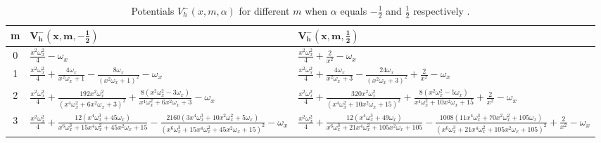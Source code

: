 \documentclass[12pt]{article}
\numberwithin{equation}{section} %
\begin{document}
\begin{table}[htp]
    \centering
    \renewcommand{\arraystretch}{1.5} %
    \setlength{\tabcolsep}{1.5em} %
    \begin{tabularx}{\columnwidth}{|c|X|X|}
    \toprule
    {\bf m} &$\mathbf{V_h^-(x,m,-\frac{1}{2})}$&$\mathbf{V_h^-(x,m,\frac{1}{2})}$\\
    \toprule
    0 &$\frac{x^2 \omega_x^2}{4} - \omega_x$ & $\frac{x^2 \omega_x^2}{4} + \frac{2}{x^2} - \omega_x$\\
    \bottomrule
    1 &$\frac{x^2 \omega_x^2}{4} + \frac{4 \omega_x}{x^2 \omega_x + 1} - \frac{8 \omega_x}{\left(x^2 \omega_x + 1\right)^2} - \omega_x$&$\frac{x^2 \omega_x^2}{4} + \frac{4 \omega_x}{x^2 \omega_x + 3} - \frac{24 \omega_x}{\left(x^2 \omega_x + 3\right)^2} + \frac{2}{x^2} - \omega_x$\\
    \bottomrule
    2 &$\frac{x^2 \omega_x^2}{4} + \frac{192 x^2 \omega_x^2}{\left(x^4 \omega_x^2 + 6 x^2 \omega_x + 3\right)^2} + \frac{8 \left(x^2 \omega_x^2 - 3 \omega_x\right)}{x^4 \omega_x^2 + 6 x^2 \omega_x + 3} - \omega_x$ &$\frac{x^2 \omega_x^2}{4} + \frac{320 x^2 \omega_x^2}{\left(x^4 \omega_x^2 + 10 x^2 \omega_x + 15\right)^2} + \frac{8 \left(x^2 \omega_x^2 - 5 \omega_x\right)}{x^4 \omega_x^2 + 10 x^2 \omega_x + 15} + \frac{2}{x^2} - \omega_x$\\
    \bottomrule
    3 &$\frac{x^2 \omega_x^2}{4} + \frac{12 \left(x^4 \omega_x^3 + 45 \omega_x\right)}{x^6 \omega_x^3 + 15 x^4 \omega_x^2 + 45 x^2 \omega_x + 15} - \frac{2160 \left(3 x^4 \omega_x^3 + 10 x^2 \omega_x^2 + 5 \omega_x\right)}{\left(x^6 \omega_x^3 + 15 x^4 \omega_x^2 + 45 x^2 \omega_x + 15\right)^2} - \omega_x$&$\frac{x^2 \omega_x^2}{4} + \frac{12 \left(x^4 \omega_x^3 + 49 \omega_x\right)}{x^6 \omega_x^3 + 21 x^4 \omega_x^2 + 105 x^2 \omega_x + 105} - \frac{1008 \left(11 x^4 \omega_x^3 + 70 x^2 \omega_x^2 + 105 \omega_x\right)}{\left(x^6 \omega_x^3 + 21 x^4 \omega_x^2 + 105 x^2 \omega_x + 105\right)^2} + \frac{2}{x^2} - \omega_x$\\
    \bottomrule
\end{tabularx}
    \caption{Potentials $V^-_h(x,m,\alpha)$ for different $m$ when $\alpha$ equals $-\frac{1}{2}$ and $\frac{1}{2}$ respectively .}
    \label{Vh-1D-table}
\end{table}
\end{document}
